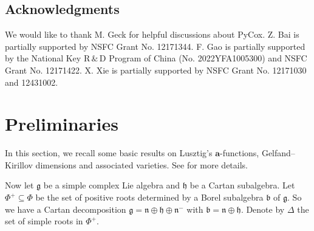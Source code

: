 \documentclass[reqno,12pt]{amsart}
\numberwithin{equation}{section}
\theoremstyle{plain}
\theoremstyle{definition}
\renewcommand{\subset}{\subseteq}
\newcommand{\aff}{ \mathbf{a} }
\begin{document}
\subsection*{Acknowledgments}
We would like to thank  M. Geck for helpful discussions about PyCox. 
Z. Bai  is partially supported  by NSFC Grant No. 12171344. F. Gao is partially supported by the National Key $\textrm{R}\,\&\,\textrm{D}$ Program of China (No. 2022YFA1005300) and  NSFC Grant No.  12171422. X. Xie is partially supported by 
NSFC Grant No. 12171030 and 12431002.



%
%


\section{Preliminaries}\label{sec:pre}


%
%

In this section, we recall some basic results on Lusztig's $\aff$-functions, Gelfand--Kirillov dimensions and associated varieties. See \cite{lusztig1984char, Vo78, Vo91} for more details.

Now let $\mathfrak{g}$ be a simple complex Lie algebra and $\mathfrak{h}$ be a Cartan subalgebra.
	Let $\Phi^+\subset\Phi$ be the set of positive roots determined by a Borel subalgebra $\mathfrak{b}$ of $\mathfrak{g}$. So we have a Cartan decomposition $\mathfrak{g}=\mathfrak{n}\oplus\mathfrak{h}\oplus\mathfrak{n}^-$ with $\mathfrak{b}=\mathfrak{n}\oplus \mathfrak{h}$. Denote by $\Delta$ the set of simple roots in $\Phi^+$.
\end{document}
